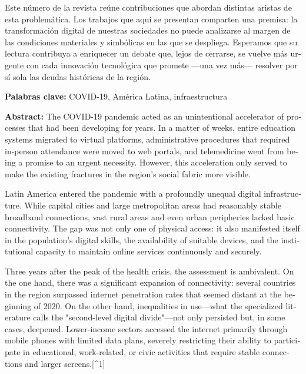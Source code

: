 \begin{tcolorbox}[colback=brown!8!white,colframe=brown!8!white,boxrule=0pt,arc=2pt,left=4pt,right=4pt,top=3pt,bottom=3pt,before skip=4pt,after skip=4pt]
\begin{otherlanguage}{spanish}
Este número de la revista reúne contribuciones que abordan distintas aristas de esta problemática. Los trabajos que aquí se presentan comparten una premisa: la transformación digital de nuestras sociedades no puede analizarse al margen de las condiciones materiales y simbólicas en las que se despliega. Esperamos que su lectura contribuya a enriquecer un debate que, lejos de cerrarse, se vuelve más urgente con cada innovación tecnológica que promete ---una vez más--- resolver por sí sola las deudas históricas de la región.
\par\smallskip\noindent\textbf{Palabras clave:} COVID-19, América Latina, infraestructura
\end{otherlanguage}
\end{tcolorbox}

\begin{tcolorbox}[colback=brown!8!white,colframe=brown!8!white,boxrule=0pt,arc=2pt,left=4pt,right=4pt,top=3pt,bottom=3pt,before skip=4pt,after skip=4pt]
\begin{otherlanguage}{english}
\sffamily\small \textbf{Abstract:} The COVID-19 pandemic acted as an unintentional accelerator of processes that had been developing for years. In a matter of weeks, entire education systems migrated to virtual platforms, administrative procedures that required in-person attendance were moved to web portals, and telemedicine went from being a promise to an urgent necessity. However, this acceleration only served to make the existing fractures in the region's social fabric more visible.

Latin America entered the pandemic with a profoundly unequal digital infrastructure. While capital cities and large metropolitan areas had reasonably stable broadband connections, vast rural areas and even urban peripheries lacked basic connectivity. The gap was not only one of physical access: it also manifested itself in the population's digital skills, the availability of suitable devices, and the institutional capacity to maintain online services continuously and securely.

Three years after the peak of the health crisis, the assessment is ambivalent. On the one hand, there was a significant expansion of connectivity: several countries in the region surpassed internet penetration rates that seemed distant at the beginning of 2020. On the other hand, inequalities in use—what the specialized literature calls the "second-level digital divide"—not only persisted but, in some cases, deepened. Lower-income sectors accessed the internet primarily through mobile phones with limited data plans, severely restricting their ability to participate in educational, work-related, or civic activities that require stable connections and larger screens.[\textasciicircum{}1]


\end{otherlanguage}
\end{tcolorbox}

